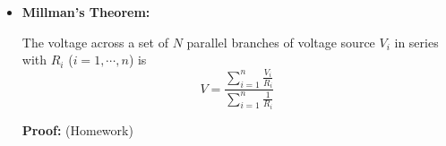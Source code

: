 \documentclass{article}
\begin{document}
\begin{itemize}
\begin{comment}
Consider two extreme cases for the two loads $R_1$ and $R_2$:
\begin{itemize}
\item when $R_1=0$ (short-circuit), then we get the short-circuit 
  current: 
  \begin{equation} 
    I_1=I_{sc}=V_0/R_0,\;\;\;\;\;\; V_1=0 
  \end{equation}
\item when $R_2=\infty$ (open-circuit), then we get the open-circuit
  voltage: 
  \begin{equation} 
    V_2=V_{oc}=V_0,\;\;\;\;\;\;\;I_2=0 
  \end{equation}
\end{itemize}
and we have $\triangle V=V_1-V_2=-V_0$, $\triangle I=V_1-V_2=V_0/R_0$,
and the output resistance is found to be:
\begin{equation} 
  R_0=-\frac{\triangle V}{\triangle I}=\frac{V_{oc}}{I_{sc}} 
\end{equation}

\end{comment}

\item {\bf Millman's Theorem:}

The voltage across a set of $N$ parallel branches of voltage source 
$V_i$ in series with $R_i$ ($i=1,\cdots,n$) is
\begin{equation}
  V=\frac{\sum_{i=1}^n \frac{V_i}{R_i}}{\sum_{i=1}^n\frac{1}{R_i}}
\end{equation}

{\bf Proof:} (Homework)

\begin{comment}
Consider applying Norton's theorem to the circuit. The short-circuit current 
of these parallel branches can be found to be (superposition):
\begin{equation}
  I_{sc}=\sum_{i=1}^n\frac{V_i}{R_i}
\end{equation}
and the total internal resistance is simply the parallel combination of the
branch resistances:
\begin{equation}
  R_0=\left(\sum_{i=1}^n\frac{1}{R_i}\right)^{-1}
\end{equation}
Therefore the open-circuit voltage across these branches is 
\begin{equation}
  V_{oc}=I_{sc} R_0=\left(\sum_{i=1}^n\frac{V_i}{R_i}\right)\left(\sum_{i=1}^n\frac{1}{R_i}\right)^{-1}
  =\frac{\sum_{i=1}^n\frac{V_i}{R_i}}{\sum_{i=1}^n\frac{1}{R_i}}
\end{equation}


\end{comment}
\end{itemize}
\end{document}
